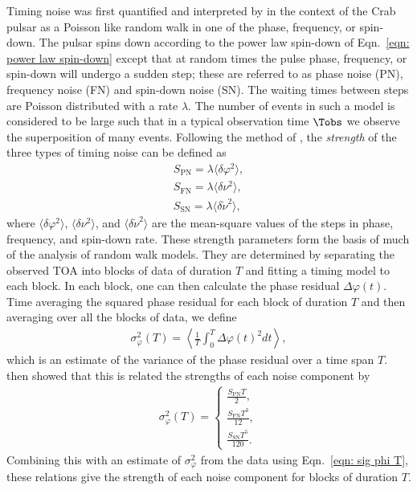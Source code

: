 Timing noise was first quantified and interpreted by \citet{Boynton1972} in the
context of the Crab pulsar as a Poisson like random walk in one of the phase,
frequency, or spin-down. The pulsar spins down according to the power law
spin-down of Eqn.~\eqref{eqn: power law spin-down} except that at random times
the pulse phase, frequency, or spin-down will undergo a sudden step; these are
referred to as phase noise (PN), frequency noise (FN) and spin-down noise (SN).
The waiting times between steps are Poisson distributed with a rate $\lambda$.
The number of events in such a model is considered to be
large such that in a typical observation time $\Tobs$ we observe the superposition
of many events. Following the method of \citet{Cordes1980}, the \emph{strength}
of the three types of timing noise can be defined as
\begin{align}
S_{\textrm{PN}} = \lambda \langle \delta \varphi^{2}\rangle, \label{eqn: SPN def} \\
S_{\textrm{FN}} = \lambda \langle \delta \nu^{2}\rangle, \label{eqn: SFN def} \\
S_{\textrm{SN}} = \lambda \langle \delta \dot{\nu}^{2}\rangle, \label{eqn: SSN def}
\end{align}
where $\langle \delta \varphi^{2} \rangle$, $\langle \delta \nu^{2} \rangle$, and
$\langle \delta \dot{\nu}^{2} \rangle$ are the mean-square values of the steps
in phase, frequency, and spin-down rate. These strength parameters form the
basis of much of the analysis of random walk models. They are determined by
separating the observed TOA into blocks of data of duration $T$ and fitting a
timing model to each block.  In each block, one can then calculate the phase
residual $\Delta\varphi(t)$. Time averaging
the squared phase residual for each block of duration $T$ and then averaging
over all the blocks of data, we define
\begin{align}
\sigma^{2}_\varphi(T) = \left\langle\frac{1}{T}\int_{0}^{T}\Delta\varphi(t)^{2} dt \right\rangle,
\label{eqn: sig phi T}
\end{align}
which is an estimate of the variance of the phase residual over a time span
$T$.  \citet{Cordes1980} then showed that this is related the strengths of each
noise component by
\begin{align}
\sigma^{2}_{\varphi}(T) = \left\{
\begin{array}{cc}
\frac{S_{\textrm{PN}} T}{2}, \\
\frac{S_{\textrm{FN}} T^{3}}{12}, \\
\frac{S_{\textrm{SN}} T^{5}}{120}.
\end{array}
\right.
\label{eqn: S calc}
\end{align}
Combining this with an estimate of $\sigma^{2}_\varphi$ from the
data using Eqn.~\eqref{eqn: sig phi T}, these relations give the strength of
each noise component for blocks of duration $T$.

